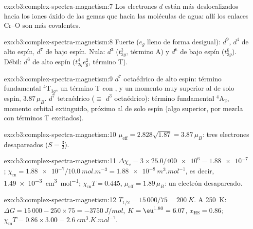 \begin{solution}{exo:b3:complex-spectra-magnetism:7}
Los electrones $d$ están más deslocalizados hacia los iones óxido de las gemas que hacia las
moléculas de agua: allí los enlaces Cr--O son más covalentes.
\end{solution}

\begin{solution}{exo:b3:complex-spectra-magnetism:8}
Fuerte ($e_g$ lleno de forma desigual): $d^9$, $d^4$ de alto espín, $d^7$ de bajo espín. Nula: $d^3$ ($t_{2g}^3$, término A) y
$d^6$ de bajo espín ($t_{2g}^6$). Débil: $d^6$ de alto espín ($t_{2g}^4e_g^2$, término T).
\end{solution}

\begin{solution}{exo:b3:complex-spectra-magnetism:9}
$d^7$ octaédrico de alto espín: término fundamental $^4$T$_{1g}$, un término T con ,
y un momento muy superior al de solo espín, $3.87\,\mu_B$. $d^7$ tetraédrico ($\equiv$ $d^3$ octaédrico): término
fundamental $^4$A$_2$, momento orbital extinguido, próximo al de solo espín (algo superior, por
mezcla con términos T excitados).
\end{solution}

\begin{solution}{exo:b3:complex-spectra-magnetism:10}
$\mu_{\mathrm{eff}} = 2.828\sqrt{1.87} = 3.87\,\mu_B$: tres electrones desapareados ($S = \frac32$).
\end{solution}

\begin{solution}{exo:b3:complex-spectra-magnetism:11}
$\Delta\chi_v = 3 \times 25.0/\num{400e6} = \num{1.88e-7}$; $\chi_{\mathrm m} = \num{1.88e-7}/\qty{10.0}{mol.m^{-3}} = \qty{1.88e-8}{m^3.mol^{-1}}$, es decir,
\qty{1.49e-3}{cm^3.mol^{-1}}; $\chi_{\mathrm m}T = 0.445$, $\mu_{\mathrm{eff}} = 1.89\,\mu_B$: un electrón desapareado.
\end{solution}

\begin{solution}{exo:b3:complex-spectra-magnetism:12}
$T_{1/2} = 15\,000/75 = \qty{200}{K}$. A \qty{250}{K}: $\Delta G = 15\,000 - 250 \times 75 = \qty{-3750}{J/mol}$, $K = \eu^{1.80} = 6.07$,
$x_{\mathrm{HS}} = 0.86$; $\chi_{\mathrm m}T = 0.86 \times 3.00 = \qty{2.6}{cm^3.K.mol^{-1}}$.
\end{solution}

